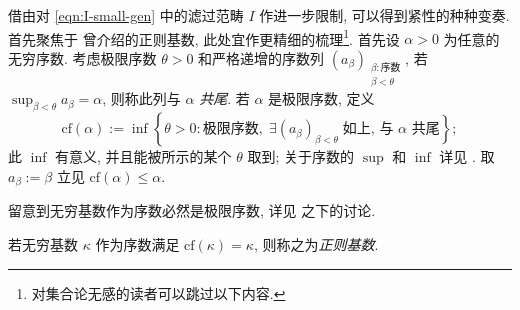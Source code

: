借由对 \eqref{eqn:I-small-gen} 中的滤过范畴 $I$ 作进一步限制, 可以得到紧性的种种变奏. 首先聚焦于 \cite[定义 1.4.10]{Li1} 曾介绍的正则基数, 此处宜作更精细的梳理\footnote{对集合论无感的读者可以跳过以下内容.}. 首先设 $\alpha > 0$ 为任意的无穷序数. 考虑极限序数 $\theta > 0$ 和严格递增的序数列 $(a_\beta)_{\substack{\beta: \text{序数} \\ \beta < \theta}}$, 若 $\sup_{\beta < \theta} a_\beta = \alpha$, 则称此列与 $\alpha$ \emph{共尾}. 若 $\alpha$ 是极限序数, 定义
\[ \mathrm{cf}(\alpha) := \inf\left\{ \theta > 0: \text{极限序数}, \; \exists (a_\beta)_{\beta < \theta}\; \text{如上, 与 $\alpha$ 共尾} \right\}; \]
此 $\inf$ 有意义, 并且能被所示的某个 $\theta$ 取到; 关于序数的 $\sup$ 和 $\inf$ 详见 \cite[定理 1.2.10]{Li1}. 取 $a_\beta := \beta$ 立见 $\mathrm{cf}(\alpha) \leq \alpha$.

留意到无穷基数作为序数必然是极限序数, 详见 \cite[引理 1.4.6]{Li1} 之下的讨论.

\begin{definition}\label{def:regular-cardinal}
	若无穷基数 $\kappa$ 作为序数满足 $\mathrm{cf}(\kappa) = \kappa$, 则称之为\emph{正则基数}.
\end{definition}

